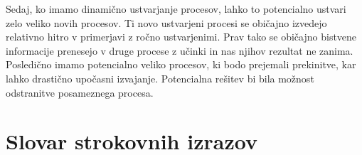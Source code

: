 Sedaj, ko imamo dinamično ustvarjanje procesov, lahko to potencialno ustvari zelo veliko novih procesov.
Ti novo ustvarjeni procesi se običajno izvedejo relativno hitro v primerjavi z ročno ustvarjenimi.
Prav tako se običajno bistvene informacije prenesejo v druge procese z učinki in nas njihov rezultat ne zanima.
Posledično imamo potencialno veliko procesov, ki bodo prejemali prekinitve, kar lahko drastično upočasni izvajanje.
Potencialna rešitev bi bila možnost odstranitve posameznega procesa.

\section*{Slovar strokovnih izrazov}






